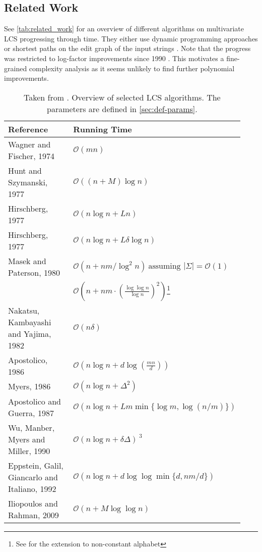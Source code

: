 \subsection{Related Work}
See \autoref{tab:related_work} for an overview of different \lcs{} algorithms on multivariate LCS progressing through time.
They either use dynamic programming approaches \cite{Wagner.1974,Hunt.1977,Hirschberg.1977,Masek.1980,Nakatsu.1982,Apostolico.1986,Apostolico.1987,Eppstein.1992,Iliopoulos.2009} or shortest paths on the edit graph of the input strings \cite{Myers.1986,Wu.1990}.
Note that the progress was restricted to log-factor improvements since 1990 \cite{Wu.1990}.
This motivates a fine-grained complexity analysis as it seems unlikely to find further polynomial improvements.

\begin{table}[ht]
\centering
\begin{tabular}{@{}p{0.48\linewidth}p{0.45\linewidth}@{}}
\toprule
\textbf{Reference} & \textbf{Running Time} \\
\midrule
Wagner and Fischer, 1974 \cite{Wagner.1974} & $\mathcal{O}(mn)$ \\
Hunt and Szymanski, 1977 \cite{Hunt.1977} & $\mathcal{O}((n+M)\log n)$ \\
Hirschberg, 1977 \cite{Hirschberg.1977} & $\mathcal{O}(n\log n + Ln)$ \\
Hirschberg, 1977 \cite{Hirschberg.1977} & $\mathcal{O}(n\log n + L\delta\log n)$ \\
Masek and Paterson, 1980 \cite{Masek.1980} & $\mathcal{O}(n + nm/\log^{2} n)\ \text{assuming } |\Sigma|=\mathcal{O}(1)$ \\
& $\mathcal{O}\!\left(n + nm\cdot(\frac{\log\log n}{\log n})^{2}\right)$\footnote{See \cite{Bille.2008} for the extension to non-constant alphabet}\\
Nakatsu, Kambayashi and Yajima, 1982 \cite{Nakatsu.1982} & $\mathcal{O}(n\delta)$ \\
Apostolico, 1986 \cite{Apostolico.1986} & $\mathcal{O}\!\left(n\log n + d\log\!\left(\tfrac{mn}{d}\right)\right)$ \\
Myers, 1986 \cite{Myers.1986} & $\mathcal{O}(n\log n + \Delta^{2})$ \\
Apostolico and Guerra, 1987 \cite{Apostolico.1987} & $\mathcal{O}\!\left(n\log n + Lm\min\{\log m,\log(n/m)\}\right)$ \\
Wu, Manber, Myers and Miller, 1990 \cite{Wu.1990} & $\mathcal{O}(n\log n + \delta\Delta)^{\;3}$ \\
Eppstein, Galil, Giancarlo and Italiano, 1992 \cite{Eppstein.1992} & $\mathcal{O}\!\left(n\log n + d\log\log\min\{d, nm/d\}\right)$ \\
Iliopoulos and Rahman, 2009 \cite{Iliopoulos.2009} & $\mathcal{O}(n + M\log\log n)$ \\
\bottomrule
\end{tabular}
\vspace{1em}
\caption{Taken from \cite{Bringman.2018}. Overview of selected LCS algorithms. The parameters are defined in \autoref{sec:def-params}.}
\label{tab:related_work}
\end{table}



